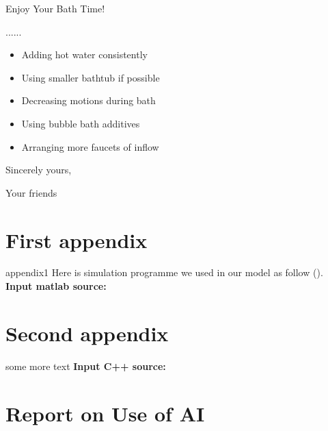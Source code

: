 \documentclass{mcmthesis}
\begin{document}
\begin{letter}{Enjoy Your Bath Time!}   %
    
......
    
    
\begin{itemize}
\item Adding hot water consistently
\item Using smaller bathtub if possible
\item Decreasing motions during bath
\item Using bubble bath additives
\item Arranging more faucets of inflow
\end{itemize}
    
\vspace{\parskip}       %
    
Sincerely yours,
    
Your friends
    
\end{letter}
    
\newpage
    
\begin{appendices}

\section{First appendix}

appendix1    
Here is simulation programme we used in our model as follow (\cite{Liu02}).\\

\textbf{\textcolor[rgb]{0.98,0.00,0.00}{Input matlab source:}}  %
    
\section{Second appendix}
    
some more text \textcolor[rgb]{0.98,0.00,0.00}{\textbf{Input C++ source:}}

    
\end{appendices}
    
\newpage
{}   
\setcounter{lastpage}{\value{page}} %
\thispagestyle{empty}   %
    
\section*{Report on Use of AI}  %
    
\end{document}
